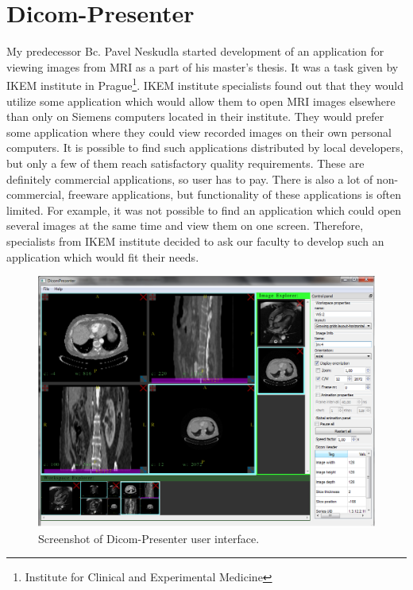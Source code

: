 \chapter*{Dicom-Presenter}
\vspace{-10mm}

My predecessor Bc. Pavel Neskudla started development of an application for viewing images from MRI as a part of his master's thesis\cite{neskudla}. It was a task given by IKEM institute in Prague\footnote{Institute for Clinical and Experimental Medicine}. IKEM institute specialists found out that they would utilize some application which would allow them to open MRI images elsewhere than only on Siemens computers located in their institute. They would prefer some application where they could view recorded images on their own personal computers. It is possible to find such applications distributed by local developers, but only a few of them reach satisfactory quality requirements. These are definitely commercial applications, so user has to pay. There is also a lot of non-commercial, freeware applications, but functionality of these applications is often limited\cite[page~9]{flaska_bc}. For example, it was not possible to find an application which could open several images at the same time and view them on one screen. Therefore, specialists from IKEM institute decided to ask our faculty to develop such an application which would fit their needs.

\begin{figure}
	\begin{center}
	\includegraphics[width=130mm]{Text/IMG/04_GUI_Screenshot.png}
	\end{center}
	\caption{Screenshot of Dicom-Presenter user interface.}
	\label{screenshot}
\end{figure}

